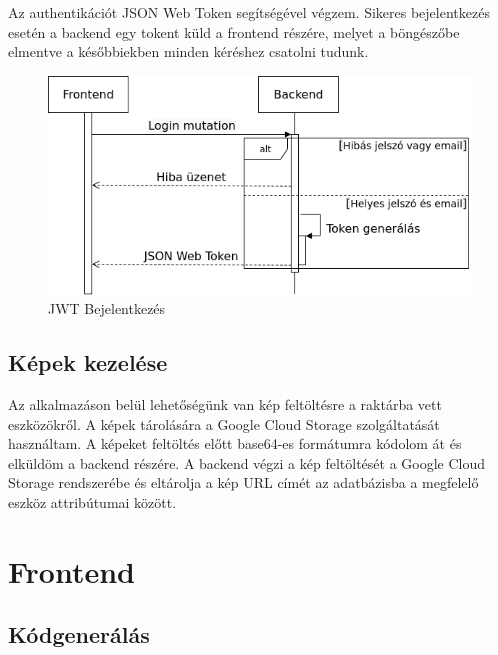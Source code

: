 Az authentikációt JSON Web Token segítségével végzem. 
Sikeres bejelentkezés esetén a backend egy tokent küld a frontend részére, melyet a böngészőbe elmentve a későbbiekben minden kéréshez csatolni tudunk.

\begin{figure}[!ht]
  \centering
  \includegraphics[width=150mm, keepaspectratio]{figures/login.png}
  \caption{JWT Bejelentkezés}
  \label{fig:JWT}
\end{figure}

\subsection{Képek kezelése}
Az alkalmazáson belül lehetőségünk van kép feltöltésre a raktárba vett eszközökről.
A képek tárolására a Google Cloud Storage szolgáltatását használtam. 
A képeket feltöltés előtt base64-es formátumra kódolom át és elküldöm a backend részére.
A backend végzi a kép feltöltését a Google Cloud Storage rendszerébe és eltárolja a kép URL címét az adatbázisba a megfelelő eszköz attribútumai között.

\section{Frontend}


\subsection{Kódgenerálás}

